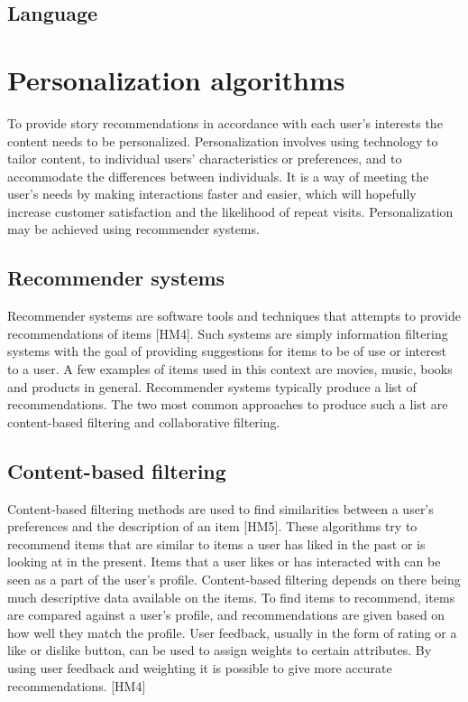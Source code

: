 \subsection{Language}

\section{Personalization algorithms}

To provide story recommendations in accordance with each user’s interests the content needs to be personalized. Personalization involves using technology to tailor content, to individual users’ characteristics or preferences, and to accommodate the differences between individuals. It is a way of meeting the user’s needs by making interactions faster and easier, which will hopefully increase customer satisfaction and the likelihood of repeat visits. Personalization may be achieved using recommender systems.

\subsection{Recommender systems}

Recommender systems are software tools and techniques that attempts to provide recommendations of items [HM4]. Such systems are simply information filtering systems with the goal of providing suggestions for items to be of use or interest to a user. A few examples of items used in this context are movies, music, books and products in general. Recommender systems typically produce a list of recommendations.  The two most common approaches to produce such a list are content-based filtering and collaborative filtering.

\subsection{Content-based filtering}

Content-based filtering methods are used to find similarities between a user’s preferences and the description of an item [HM5]. These algorithms try to recommend items that are similar to items a user has liked in the past or is looking at in the present. Items that a user likes or has interacted with can be seen as a part of the user’s profile. Content-based filtering depends on there being much descriptive data available on the items. To find items to recommend, items are compared against a user’s profile, and recommendations are given based on how well they match the profile. User feedback, usually in the form of rating or a like or dislike button, can be used to assign weights to certain attributes. By using user feedback and weighting it is possible to give more accurate recommendations. [HM4]

